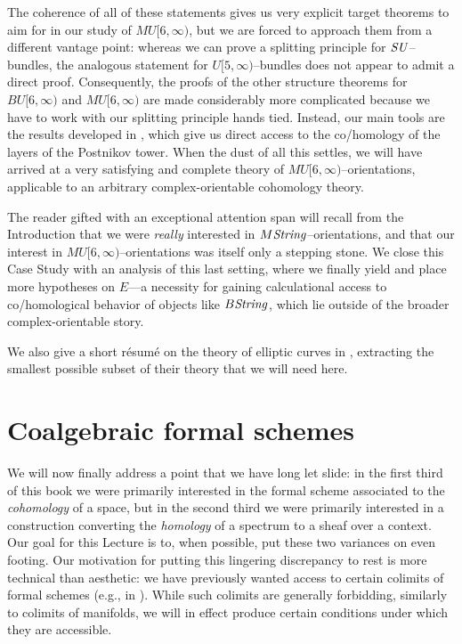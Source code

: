 The coherence of all of these statements gives us very explicit target theorems to aim for in our study of \(MU[6, \infty)\), but we are forced to approach them from a different vantage point: whereas we can prove a splitting principle for \(\mathit{SU}\)--bundles, the analogous statement for \(U[5, \infty)\)--bundles does not appear to admit a direct proof.
Consequently, the proofs of the other structure theorems for \(BU[6, \infty)\) and \(MU[6, \infty)\) are made considerably more complicated because we have to work with our splitting principle hands tied.
Instead, our main tools are the results developed in , which give us direct access to the co/homology of the layers of the Postnikov tower.
When the dust of all this settles, we will have arrived at a very satisfying and complete theory of \(MU[6, \infty)\)--orientations, applicable to an arbitrary complex-orientable cohomology theory.

The reader gifted with an exceptional attention span will recall from the Introduction that we were \emph{really} interested in \(M\mathit{String}\)--orientations, and that our interest in \(MU[6, \infty)\)--orientations was itself only a stepping stone.
We close this Case Study with an analysis of this last setting, where we finally yield and place more hypotheses on \(E\)---a necessity for gaining calculational access to co/homological behavior of objects like \(B\mathit{String}\), which lie outside of the broader complex-orientable story.

We also give a short r\'esum\'e on the theory of elliptic curves in , extracting the smallest possible subset of their theory that we will need here.









\section{Coalgebraic formal schemes}

We will now finally address a point that we have long let slide: in the first third of this book we were primarily interested in the formal scheme associated to the \emph{cohomology} of a space, but in the second third we were primarily interested in a construction converting the \emph{homology} of a spectrum to a sheaf over a context.
Our goal for this Lecture is to, when possible, put these two variances on even footing.
Our motivation for putting this lingering discrepancy to rest is more technical than aesthetic: we have previously wanted access to certain colimits of formal schemes (e.g., in ).
While such colimits are generally forbidding, similarly to colimits of manifolds, we will in effect produce certain conditions under which they are accessible.

